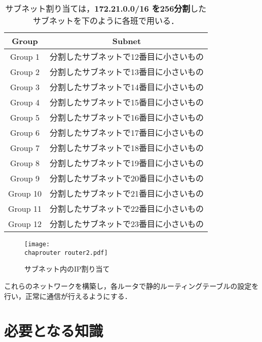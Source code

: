 \begin{table}[tb]
    \centering
    \caption{サブネット割り当ては，\textbf{172.21.0.0/16 を256分割}したサブネットを下のように各班で用いる．}
    \label{tab:16:subnet}
    \begin{tabular}{c|c}
        \hline
         Group & Subnet \\
         \hline
         Group 1 & 分割したサブネットで12番目に小さいもの\\
         Group 2 & 分割したサブネットで13番目に小さいもの\\
         Group 3 & 分割したサブネットで14番目に小さいもの\\
         Group 4 & 分割したサブネットで15番目に小さいもの\\
         Group 5 & 分割したサブネットで16番目に小さいもの\\
         Group 6 & 分割したサブネットで17番目に小さいもの\\
         Group 7 & 分割したサブネットで18番目に小さいもの\\
         Group 8 & 分割したサブネットで19番目に小さいもの\\
         Group 9 & 分割したサブネットで20番目に小さいもの\\
         Group 10 & 分割したサブネットで21番目に小さいもの\\
         Group 11 & 分割したサブネットで22番目に小さいもの\\
         Group 12 & 分割したサブネットで23番目に小さいもの\\
         \hline
    \end{tabular}
\end{table}

\begin{figure}[tb]
\begin{center}
 \texttt{[image: \\chaprouter router2.pdf]}
 \caption{サブネット内のIP割り当て}
 \label{fig:16:ipadress}
\end{center} 
\end{figure}

これらのネットワークを構築し，各ルータで静的ルーティングテーブルの設定を
行い，正常に通信が行えるようにする．

\section{必要となる知識}


